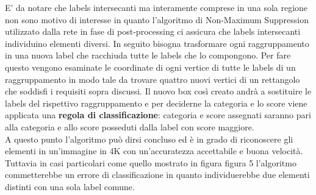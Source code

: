 E' da notare che labels intersecanti ma interamente comprese in una sola regione non sono motivo di interesse in quanto l'algoritmo di Non-Maximum Suppression utilizzato dalla rete in fase di post-processing ci assicura che labels intersecanti individuino elementi diversi.
In seguito bisogna trasformare ogni raggruppamento in una nuova label che racchiuda tutte le labels che lo compongono. Per fare questo vengono esaminate le coordinate di ogni vertice di tutte le labels di un raggruppamento in modo tale da trovare quattro nuovi vertici di un rettangolo che soddisfi i requisiti sopra discussi. Il nuovo box così creato andrà a sostituire le labels del rispettivo raggruppamento e per deciderne la categoria e lo score viene applicata una \textbf{regola di classificazione}: categoria e score assegnati saranno pari alla categoria e allo score posseduti dalla label con score maggiore. \\
A questo punto l'algoritmo può dirsi concluso ed è in grado di riconoscere gli elementi in un'immagine in 4K con un'accuratezza accettabile e buona velocità. Tuttavia in casi particolari come quello mostrato in figura figura 5 l'algoritmo commetterebbe un errore di classificazione in quanto individuerebbe due elementi distinti con una sola label comune.
